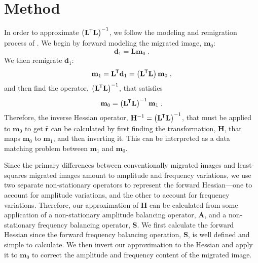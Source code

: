 \section{Method}
    In order to approximate $\left ( \mathbf{L}^{\mkern-1.5mu\mathsf{T}}\mathbf{L}\right) ^{-1}$, we follow the modeling and remigration process of \cite{imop}. 
    We begin by forward modeling the migrated image, $\mathbf{m}_0$:
    \begin{equation}
        \mathbf{d}_1 = \mathbf{L}\mathbf{m}_0 \;.
    \end{equation}
    We then remigrate $\mathbf{d}_1$:
    \begin{equation}
        \mathbf{m}_1 = \mathbf{L}^{\mkern-1.5mu\mathsf{T}}\mathbf{d}_1 = \left ( \mathbf{L}^{\mkern-1.5mu\mathsf{T}}\mathbf{L}\right ) \mathbf{m}_0 \; ,
    \end{equation}
    and then find the operator, $\left ( \mathbf{L} ^{\mkern-1.5mu\mathsf{T}} \mathbf{L} \right )^{-1}$, that satisfies
    \begin{equation}
        \mathbf{m}_0 = \left ( \mathbf{L}^{\mkern-1.5mu\mathsf{T}}\mathbf{L} \right ) ^{-1} \mathbf{m}_1 \;.
    \end{equation}
    Therefore, the inverse Hessian operator, $\mathbf{H}^{-1} = \left ( \mathbf{L} ^{\mkern-1.5mu\mathsf{T}} \mathbf{L} \right )^{-1}$, that must be applied to $\mathbf{m}_0$ to get $\hat{\mathbf{r}}$ can be calculated by first finding the transformation, $\mathbf{H}$, that maps $\mathbf{m}_0$ to $\mathbf{m}_1$, and then inverting it.
    This can be interpreted as a data matching problem between $\mathbf{m}_1$ and $\mathbf{m}_0$.

    Since the primary differences between conventionally migrated images and least-squares migrated images amount to amplitude and frequency variations, we use two separate non-stationary operators to represent the forward Hessian---one to account for amplitude variations, and the other to account for frequency variations. 
    Therefore, our approximation of $\mathbf{H}$ can be calculated from some application of a non-stationary amplitude balancing operator, $\mathbf{A}$, and a non-stationary frequency balancing operator, $\mathbf{S}$.
    We first calculate the forward Hessian since the forward frequency balancing operation, $\mathbf{S}$, is well defined and simple to calculate. 
    We then invert our approximation to the Hessian and apply it to $\mathbf{m}_0$ to correct the amplitude and frequency content of the migrated image.


